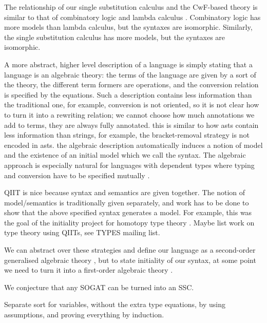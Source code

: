 \documentclass[sigplan,10pt,anonymous,review]{acmart}\settopmatter{printfolios=true,printccs=false,printacmref=false}
\begin{document}
The relationship of our single substitution calculus and the CwF-based
theory is similar to that of combinatory logic and lambda calculus
\cite{DBLP:conf/fscd/AltenkirchKSV23}. Combinatory logic has more
models than lambda calculus, but the syntaxes are
isomorphic. Similarly, the single substitution calculus has more
models, but the syntaxes are isomorphic.

A more abstract, higher level description of a language is simply
stating that a language is an algebraic theory: the terms of the
language are given by a sort of the theory, the different term formers
are operations, and the conversion relation is specified by the
equations. Such a description contains less information than the
traditional one, for example, conversion is not oriented, so it is not
clear how to turn it into a rewriting relation; we cannot choose how
much annotations we add to terms, they are always fully
annotated. this is similar to how asts contain less information than
strings, for example, the bracket-removal strategy is not encoded in
asts. the algebraic description automatically induces a notion of
model and the existence of an initial model
\cite{DBLP:journals/pacmpl/KaposiKA19} which we call the syntax. The
algebraic approach is especially natural for languages with dependent
types where typing and conversion have to be specified mutually
\cite{DBLP:conf/popl/AltenkirchK16}.

QIIT is nice because syntax and semantics are given together. The
notion of model/semantics is traditionally given separately, and work
has to be done to show that the above specified syntax generates a
model. For example, this was the goal of the initiality project for
homotopy type theory \cite{brunerie}. Maybe list work on type theory
using QIITs, see TYPES mailing list.

We can abstract over these strategies and define our language as a
second-order generalised algebraic theory
\cite{DBLP:journals/corr/abs-1904-04097}, but to state initiality of
our syntax, at some point we need to turn it into a first-order
algebraic theory \cite{DBLP:conf/fscd/BocquetKS23}.

We conjecture that any SOGAT can be turned into an SSC.

Separate sort for variables, without the extra type equations, by
using assumptions, and proving everything by induction.

{}

\end{document}
